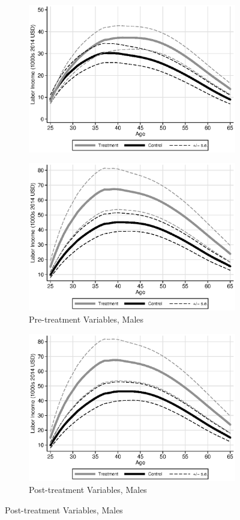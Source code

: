 \begin{figure}
\begin{subfigure}[h]{0.3\textwidth}
		\includegraphics[width=\textwidth]{output/labor_25-65_pset1_mset3_female.eps}
\end{subfigure}
\begin{subfigure}[h]{0.3\textwidth}
		\centering
		\caption{Pre-treatment Variables, Males} 
		\includegraphics[width=\textwidth]{output/labor_25-65_pset1_mset1_male.eps}
\end{subfigure}%
\begin{subfigure}[h]{0.3\textwidth}
	\centering
	\caption{Post-treatment Variables, Males} 
		\includegraphics[width=\textwidth]{output/labor_25-65_pset1_mset2_male.eps}

\end{subfigure}
\end{figure}
